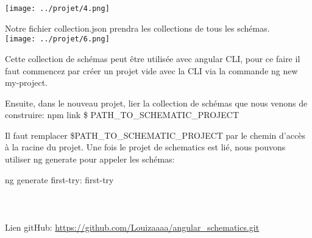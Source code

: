 \documentclass[12pt,french]{article}
\begin{document}
	\texttt{[image: ../projet/4.png]} 
		
	Notre fichier collection.json prendra les collections de tous les schémas.\\
	
		\texttt{[image: ../projet/6.png]}  
	
	Cette collection de schémas peut être utilisée avec angular CLI, pour ce faire il faut commencez par créer un projet vide avec la CLI via la commande ng new my-project.
	
	Ensuite, dans le nouveau projet, lier la collection de schémas que nous venons de construire:
\newline	
	npm link \$ PATH\_TO\_SCHEMATIC\_PROJECT\newline 
	
	Il faut remplacer \$PATH\_TO\_SCHEMATIC\_PROJECT par le chemin d'accès à la racine du projet. 
	Une fois le projet de schematics est lié, nous pouvons utiliser ng generate pour appeler les schémas:\newline
	
	ng generate first-try: first-try \\
		 \\
		 \\
		 \\
Lien gitHub: \url{https://github.com/Louizaaaa/angular_schematics.git}  
	
\end{document}
